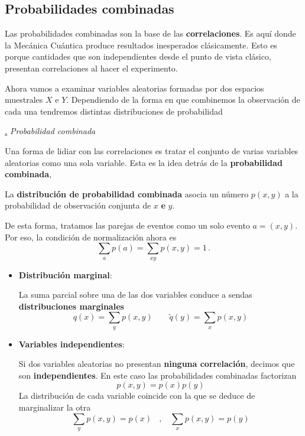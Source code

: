 \documentclass[a4paper,11pt]{book} %
\numberwithin{equation}{chapter}
\def\subsubiContadorIt{\par\addtocounter{subsubsection}{1}\underline{\it\thesubsubsection.}\hskip0.5cm \setcounter{subsubsubsectionIt}{0}}
\newcommand{\SubsubiIt}[1]{
		\subsubiContadorIt \textit{#1}
	}
\newcounter{subsubsubsectionIt}[subsubsection]
\begin{document}
		\subsection{Probabilidades combinadas}

Las probabilidades combinadas son la base de las \textbf{correlaciones}. Es aquí donde la Mecánica Cuántica produce resultados inesperados clásicamente. Esto es porque cantidades que son independientes desde el punto de vista clásico, presentan correlaciones al hacer el experimento. 

Ahora vamos a examinar variables aleatorias formadas por dos espacios muestrales $X$ e $Y$. Dependiendo de la forma en que combinemos la observación de cada una tendremos distintas distribuciones de probabilidad

			\SubsubiIt{Probabilidad combinada}

Una forma de lidiar con las correlaciones es tratar el conjunto de varias variables aleatorias como una sola variable. Esta es la idea detrás de la \textbf{probabilidad combinada}, 

\begin{mybox_gray2}{}
La \textbf{distribución de probabilidad combinada} asocia un número $p(x,y)$ a la probabilidad de observación conjunta de $x$ \textbf{e} $y$. 

De esta forma, tratamos las parejas de eventos  como un solo evento  $a = (x,y)$. Por eso, la condición de normalización ahora es 
	\begin{equation}
	\sum_a p(a) = \sum_{xy} p(x,y) = 1\, .
	\end{equation}
\end{mybox_gray2}

\begin{itemize}
	\item \textbf{Distribución marginal}:
	
	La suma parcial sobre una de las dos variables conduce a sendas \textbf{distribuciones marginales}
		\begin{equation}
		q(x) = \sum_{y} p(x,y) ~~~~~~~~~ \tilde q(y) = \sum_{x} p(x,y)
		\end{equation}

	\item \textbf{Variables independientes}:
	
	Si dos variables aleatorias no presentan \textbf{ninguna correlación}, decimos que son \textbf{independientes}. En este caso las probabilidades combinadas factorizan 
	\begin{equation}
	p(x,y) = p(x) p(y)
	\end{equation}
La distribución de cada variable coincide con la que se deduce de marginalizar la otra
	\begin{equation}
	\sum_y p(x,y) = p(x)~~~~,~~~~\sum_x p(x,y) = p(y)
	\end{equation}

\end{itemize}
\end{document}
